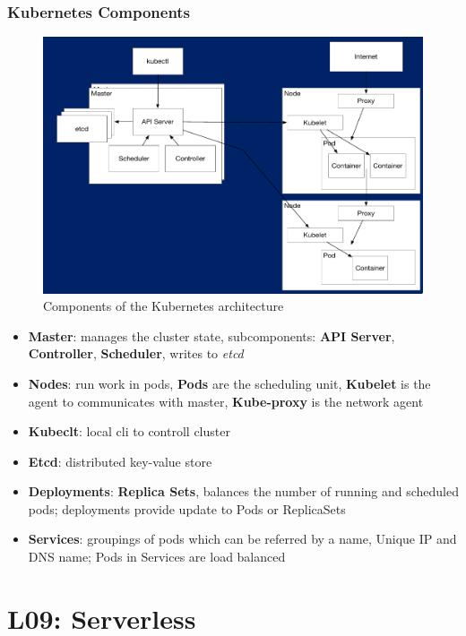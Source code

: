 \documentclass[a4paper]{article}
\begin{document}
\begin{multicols}{3}
\subsubsection{Kubernetes Components}
\begin{figure}[H]
    \includegraphics[width=\linewidth]{KubernetesComponents.png}
    \caption{Components of the Kubernetes architecture}
    \label{fig:kubernetescomponents}
\end{figure}

\begin{itemize}
    \item \textbf{Master}: manages the cluster state, subcomponents: \textbf{API Server}, \textbf{Controller}, \textbf{Scheduler}, writes to \textit{etcd} 
    \item \textbf{Nodes}: run work in pods, \textbf{Pods} are the scheduling unit, \textbf{Kubelet} is the agent to communicates with master, \textbf{Kube-proxy} is the network agent
    \item \textbf{Kubeclt}: local cli to controll cluster
    \item \textbf{Etcd}: distributed key-value store
    \item \textbf{Deployments}: \textbf{Replica Sets}, balances the number of running and scheduled pods; deployments provide update to Pods or ReplicaSets
    \item \textbf{Services}: groupings of pods which can be referred by a name, Unique IP and DNS name; Pods in Services are load balanced 
\end{itemize}

\section{L09: Serverless}


\end{multicols}
\end{document}
